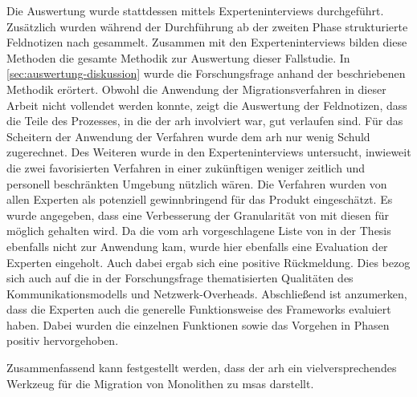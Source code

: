 Die Auswertung wurde stattdessen mittels Experteninterviews durchgeführt. 
Zusätzlich wurden während der Durchführung ab der zweiten Phase strukturierte Feldnotizen nach  gesammelt.
Zusammen mit den Experteninterviews bilden diese Methoden die gesamte Methodik zur Auswertung dieser Fallstudie.
In \cref{sec:auswertung-diskussion} wurde die Forschungsfrage anhand der beschriebenen Methodik erörtert.
Obwohl die Anwendung der Migrationsverfahren in dieser Arbeit nicht vollendet werden konnte, zeigt die Auswertung der Feldnotizen, dass die Teile des Prozesses, in die der \gls{arh} involviert war, gut verlaufen sind.
Für das Scheitern der Anwendung der Verfahren wurde dem \gls{arh} nur wenig Schuld zugerechnet.
Des Weiteren wurde in den Experteninterviews untersucht, inwieweit die zwei favorisierten Verfahren in einer zukünftigen weniger zeitlich und personell beschränkten Umgebung nützlich wären.
Die Verfahren wurden von allen Experten als potenziell gewinnbringend für das Produkt eingeschätzt. 
Es wurde angegeben, dass eine Verbesserung der Granularität von \jf mit diesen für möglich gehalten wird.
Da die vom \gls{arh} vorgeschlagene Liste von \bpp in der Thesis ebenfalls nicht zur Anwendung kam, wurde hier ebenfalls eine Evaluation der Experten eingeholt.
Auch dabei ergab sich eine positive Rückmeldung.
Dies bezog sich auch auf die in der Forschungsfrage thematisierten Qualitäten des Kommunikationsmodells und Netzwerk-Overheads.
Abschließend ist anzumerken, dass die Experten auch die generelle Funktionsweise des Frameworks evaluiert haben. 
Dabei wurden die einzelnen Funktionen sowie das Vorgehen in Phasen positiv hervorgehoben.
%

Zusammenfassend kann festgestellt werden, dass der \gls{arh} ein vielversprechendes Werkzeug für die Migration von Monolithen zu \glspl{msa} darstellt.

